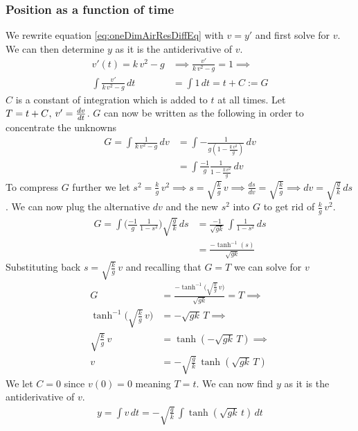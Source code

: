 \documentclass[%
aip,
jmp,
amsmath,amssymb,
reprint,%
]{revtex4-1}
\newcommand{\comma}{\hspace{0.1mm},\hspace{0.7mm}}
\begin{document}
	\subsubsection{Position as a function of time}\label{seq:oneDimYt}
	We rewrite equation \eqref{eq:oneDimAirResDiffEq} with $v = y'$ and first solve for $v$. We can then determine $y$ as it is the antiderivative of $v$.
	\begin{align}\nonumber
		v'(t) = k\,v^2 - g &\implies \frac{v'}{k\, v^2 - g} = 1 \implies\\\label{eq:oneDimAirResGSolve}
		\int \frac{v'}{k\, v^2 - g}\,dt &= \int 1 \,dt = t + C := G
	\end{align}
	$C$ is a constant of integration which is added to $t$ at all times. Let $T = t + C \comma v' = \frac{dv}{dt}$. $G$ can now be written as the following in order to concentrate the unknowns
	\begin{align}\nonumber
		G=\int \frac{1}{k\, v^2-g}\,dv &= \int -\frac{1}{g(1-\frac{k\,v^2}{g})}\,dv \\\nonumber
		&= \int \frac{-1}{g} \frac{1}{1-\frac{k\,v^2}{g}}\,dv
	\end{align}
	To compress $G$ further we let $s^2 = \frac{k}{g}\,v^2 \implies s = \sqrt{\frac{k}{g}}\,v \implies \frac{ds}{dv} = \sqrt{\frac{k}{g}} \implies dv = \sqrt{\frac{g}{k}}\,ds$. We can now plug the alternative $dv$ and the new $s^2$ into $G$ to get rid of $\frac{k}{g}\,v^2$.
	\begin{align}\nonumber
		G = \int \Big(\frac{-1}{g} \, \frac{1}{1-s^2}\Big)\sqrt{\frac{g}{k}}\,ds &= \frac{-1}{\sqrt{gk}}\, \int \frac{1}{1-s^2}\,ds\\\nonumber
		&= \frac{-\tanh^{-1}(s)}{\sqrt{gk}}
	\end{align}
	Substituting back $s=\sqrt{\frac{k}{g}}\,v$ and recalling that $G = T$ we can  solve for $v$
	\begin{align}\nonumber
		G &= \frac{-\tanh^{-1}\big(\sqrt{\frac{k}{g}}\,v\big)}{\sqrt{gk}} = T \implies\\\nonumber
		\tanh^{-1}\Big(\sqrt{\frac{k}{g}}\,v\Big) &= -\sqrt{gk}\,T\implies\\\nonumber
		\sqrt{\frac{k}{g}}\,v &= \tanh(-\sqrt{gk}\,T) \implies \\\label{eq:oneDimAirResVT}
		v &= -\sqrt{\frac{g}{k}}\,\tanh(\sqrt{gk}\,T)
	\end{align}
	We let $C = 0$ since $v(0) = 0$ meaning $T = t$. We can now find $y$ as it is the antiderivative of $v$.
	\begin{align}\nonumber
		y = \int v\,dt = -\sqrt{\frac{g}{k}}\,\int \tanh(\sqrt{gk}\,t)\,dt
	\end{align}
\end{document}
